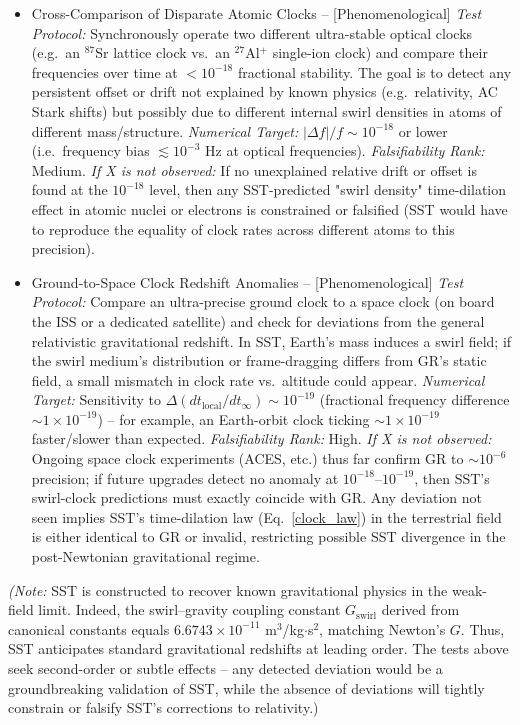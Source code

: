 \documentclass[11pt]{article}
\begin{document}
\begin{itemize}
\item
    Cross-Comparison of Disparate Atomic Clocks -- [Phenomenological] \textit{Test Protocol:} Synchronously operate two different ultra-stable optical clocks (e.g.\ an ${}^{87}$Sr lattice clock vs.\ an ${}^{27}$Al$^+$ single-ion clock) and compare their frequencies over time at $<10^{-18}$ fractional stability. The goal is to detect any persistent offset or drift not explained by known physics (e.g.\ relativity, AC Stark shifts) but possibly due to different internal swirl densities in atoms of different mass/structure. \textit{Numerical Target:} $|\Delta f|/f \sim 10^{-18}$ or lower (i.e.\ frequency bias $\lesssim 10^{-3}$ Hz at optical frequencies). \textit{Falsifiability Rank:} Medium. \textit{If X is not observed:} If no unexplained relative drift or offset is found at the $10^{-18}$ level, then any SST-predicted "swirl density" time-dilation effect in atomic nuclei or electrons is constrained or falsified (SST would have to reproduce the equality of clock rates across different atoms to this precision).

\item
    Ground-to-Space Clock Redshift Anomalies -- [Phenomenological] \textit{Test Protocol:} Compare an ultra-precise ground clock to a space clock (on board the ISS or a dedicated satellite) and check for deviations from the general relativistic gravitational redshift. In SST, Earth's mass induces a swirl field; if the swirl medium's distribution or frame-dragging differs from GR's static field, a small mismatch in clock rate vs.\ altitude could appear. \textit{Numerical Target:} Sensitivity to $\Delta (dt_{\text{local}}/dt_{\infty}) \sim 10^{-19}$ (fractional frequency difference $\sim 1\times10^{-19}$) -- for example, an Earth-orbit clock ticking $\sim 1\times10^{-19}$ faster/slower than expected. \textit{Falsifiability Rank:} High. \textit{If X is not observed:} Ongoing space clock experiments (ACES, etc.) thus far confirm GR to $\sim 10^{-6}$ precision; if future upgrades detect no anomaly at $10^{-18}$--$10^{-19}$, then SST's swirl-clock predictions must exactly coincide with GR. Any deviation not seen implies SST's time-dilation law (Eq.~\ref{clock_law}) in the terrestrial field is either identical to GR or invalid, restricting possible SST divergence in the post-Newtonian gravitational regime.
\end{itemize}

\textit{(Note:} SST is constructed to recover known gravitational physics in the weak-field limit. Indeed, the swirl--gravity coupling constant $G_{\text{swirl}}$ derived from canonical constants equals $6.6743\times10^{-11}$ m$^3$/kg$\cdot$s$^2$, matching Newton's $G$. Thus, SST anticipates standard gravitational redshifts at leading order. The tests above seek second-order or subtle effects -- any detected deviation would be a groundbreaking validation of SST, while the absence of deviations will tightly constrain or falsify SST's corrections to relativity.)
\end{document}
